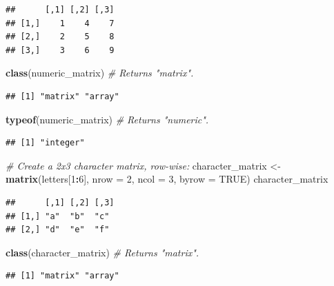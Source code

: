 \documentclass[
]{book}
\newenvironment{Shaded}{\begin{snugshade}}{\end{snugshade}}
\newcommand{\AttributeTok}[1]{\textcolor[rgb]{0.13,0.29,0.53}{#1}}
\newcommand{\CommentTok}[1]{\textcolor[rgb]{0.56,0.35,0.01}{\textit{#1}}}
\newcommand{\ConstantTok}[1]{\textcolor[rgb]{0.56,0.35,0.01}{#1}}
\newcommand{\DecValTok}[1]{\textcolor[rgb]{0.00,0.00,0.81}{#1}}
\newcommand{\FunctionTok}[1]{\textcolor[rgb]{0.13,0.29,0.53}{\textbf{#1}}}
\newcommand{\NormalTok}[1]{#1}
\newcommand{\OtherTok}[1]{\textcolor[rgb]{0.56,0.35,0.01}{#1}}
\newcommand{\SpecialCharTok}[1]{\textcolor[rgb]{0.81,0.36,0.00}{\textbf{#1}}}
\begin{document}
\begin{verbatim}
##      [,1] [,2] [,3]
## [1,]    1    4    7
## [2,]    2    5    8
## [3,]    3    6    9
\end{verbatim}

\begin{Shaded}
\begin{Highlighting}[]
\FunctionTok{class}\NormalTok{(numeric\_matrix)  }\CommentTok{\# Returns "matrix".}
\end{Highlighting}
\end{Shaded}

\begin{verbatim}
## [1] "matrix" "array"
\end{verbatim}

\begin{Shaded}
\begin{Highlighting}[]
\FunctionTok{typeof}\NormalTok{(numeric\_matrix)  }\CommentTok{\# Returns "numeric".}
\end{Highlighting}
\end{Shaded}

\begin{verbatim}
## [1] "integer"
\end{verbatim}

\begin{Shaded}
\begin{Highlighting}[]
\CommentTok{\# Create a 2x3 character matrix, row{-}wise:}
\NormalTok{character\_matrix }\OtherTok{\textless{}{-}} \FunctionTok{matrix}\NormalTok{(letters[}\DecValTok{1}\SpecialCharTok{:}\DecValTok{6}\NormalTok{], }\AttributeTok{nrow =} \DecValTok{2}\NormalTok{, }\AttributeTok{ncol =} \DecValTok{3}\NormalTok{, }\AttributeTok{byrow =} \ConstantTok{TRUE}\NormalTok{)}
\NormalTok{character\_matrix}
\end{Highlighting}
\end{Shaded}

\begin{verbatim}
##      [,1] [,2] [,3]
## [1,] "a"  "b"  "c" 
## [2,] "d"  "e"  "f"
\end{verbatim}

\begin{Shaded}
\begin{Highlighting}[]
\FunctionTok{class}\NormalTok{(character\_matrix)  }\CommentTok{\# Returns "matrix".}
\end{Highlighting}
\end{Shaded}

\begin{verbatim}
## [1] "matrix" "array"
\end{verbatim}
\end{document}
